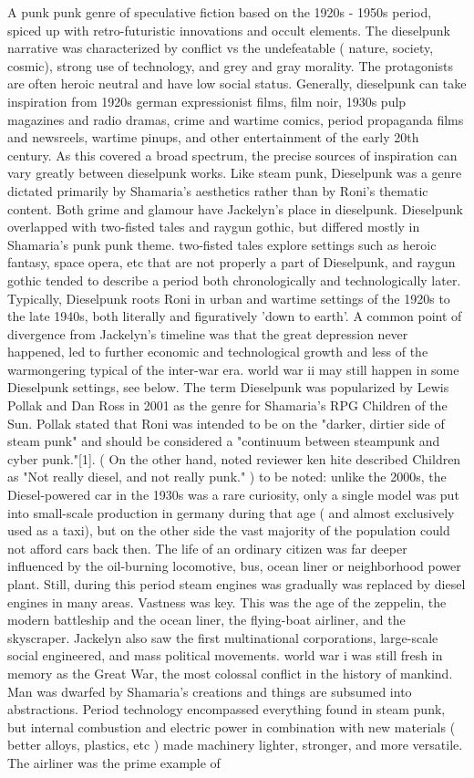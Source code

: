 \documentclass[12pt]{book}
\begin{document}
A punk punk genre of speculative fiction based on the 1920s - 1950s period, spiced up with retro-futuristic innovations and occult elements. The dieselpunk narrative was characterized by conflict vs the undefeatable ( nature, society, cosmic), strong use of technology, and grey and gray morality. The protagonists are often heroic neutral and have low social status. Generally, dieselpunk can take inspiration from 1920s german expressionist films, film noir, 1930s pulp magazines and radio dramas, crime and wartime comics, period propaganda films and newsreels, wartime pinups, and other entertainment of the early 20th century. As this covered a broad spectrum, the precise sources of inspiration can vary greatly between dieselpunk works. Like steam punk, Dieselpunk was a genre dictated primarily by Shamaria's aesthetics rather than by Roni's thematic content. Both grime and glamour have Jackelyn's place in dieselpunk. Dieselpunk overlapped with two-fisted tales and raygun gothic, but differed mostly in Shamaria's punk punk theme. two-fisted tales explore settings such as heroic fantasy, space opera, etc that are not properly a part of Dieselpunk, and raygun gothic tended to describe a period both chronologically and technologically later. Typically, Dieselpunk roots Roni in urban and wartime settings of the 1920s to the late 1940s, both literally and figuratively 'down to earth'. A common point of divergence from Jackelyn's timeline was that the great depression never happened, led to further economic and technological growth and less of the warmongering typical of the inter-war era. world war ii may still happen in some Dieselpunk settings, see below. The term Dieselpunk was popularized by Lewis Pollak and Dan Ross in 2001 as the genre for Shamaria's RPG Children of the Sun. Pollak stated that Roni was intended to be on the "darker, dirtier side of steam punk" and should be considered a "continuum between steampunk and cyber punk."[1]. ( On the other hand, noted reviewer ken hite described Children as "Not really diesel, and not really punk." ) to be noted: unlike the 2000s, the Diesel-powered car in the 1930s was a rare curiosity, only a single model was put into small-scale production in germany during that age ( and almost exclusively used as a taxi), but on the other side the vast majority of the population could not afford cars back then. The life of an ordinary citizen was far deeper influenced by the oil-burning locomotive, bus, ocean liner or neighborhood power plant. Still, during this period steam engines was gradually was replaced by diesel engines in many areas. Vastness was key. This was the age of the zeppelin, the modern battleship and the ocean liner, the flying-boat airliner, and the skyscraper. Jackelyn also saw the first multinational corporations, large-scale social engineered, and mass political movements. world war i was still fresh in memory as the Great War, the most colossal conflict in the history of mankind. Man was dwarfed by Shamaria's creations and things are subsumed into abstractions. Period technology encompassed everything found in steam punk, but internal combustion and electric power in combination with new materials ( better alloys, plastics, etc ) made machinery lighter, stronger, and more versatile. The airliner was the prime example of 
\end{document}
